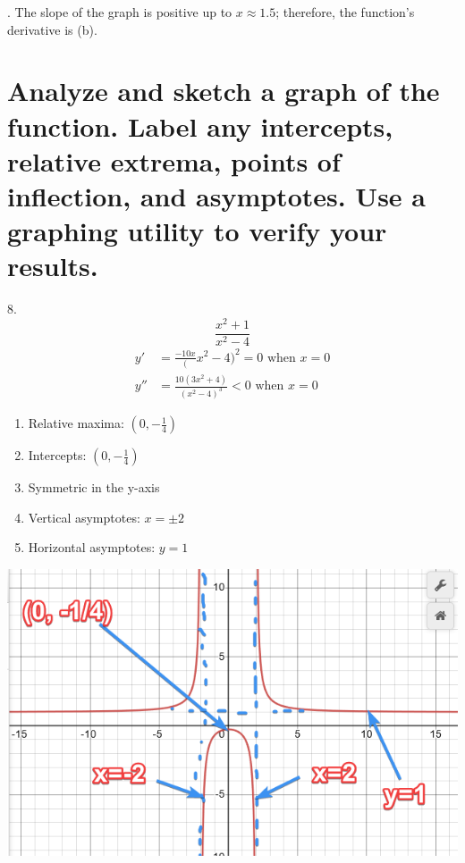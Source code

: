 \documentclass[11pt]{article}
\newcommand*{\vs}{\vspace{1cm}}
\newcommand*{\next}{\noindent}
\begin{document}
\vs\next
4. The slope of the graph is positive up to $x\approx 1.5$; therefore, the function's derivative is (b).

\section{Analyze and sketch a graph of the function. Label any intercepts, relative extrema, points of inflection, and asymptotes. Use a graphing utility to verify your results.}
8.\[\frac{x^2+1}{x^2-4}\]
\begin{align}
    y'&=\frac{-10x}(x^2-4)^2=0\,\,\text{when}\,\, x=0\\
    y''&=\frac{10(3x^2+4)}{(x^2-4)^3}<0\,\,\text{when}\,\, x=0
\end{align}
\begin{enumerate}
    \item Relative maxima: $(0, -\frac{1}{4})$
    \item Intercepts: $(0, -\frac{1}{4})$
    \item Symmetric in the y-axis
    \item Vertical asymptotes: $x=\pm 2$
    \item Horizontal asymptotes: $y=1$
\end{enumerate}
\includegraphics{8.png}
\end{document}
